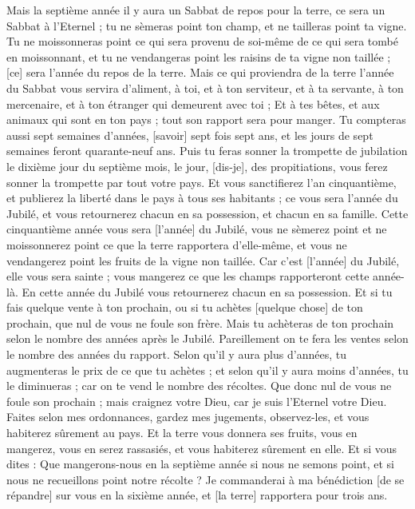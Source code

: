 \begin{multicols}{2}
Mais la septième année il y aura un Sabbat de repos pour la terre, ce sera un Sabbat à l'Eternel ; tu ne sèmeras point ton champ, et ne tailleras point ta vigne.
Tu ne moissonneras point ce qui sera provenu de soi-même de ce qui sera tombé en moissonnant, et tu ne vendangeras point les raisins de ta vigne non taillée ; [ce] sera l'année du repos de la terre.
Mais ce qui proviendra de la terre l'année du Sabbat vous servira d'aliment, à toi, et à ton serviteur, et à ta servante, à ton mercenaire, et à ton étranger qui demeurent avec toi ;
Et à tes bêtes, et aux animaux qui sont en ton pays ; tout son rapport sera pour manger.
Tu compteras aussi sept semaines d'années, [savoir] sept fois sept ans, et les jours de sept semaines feront quarante-neuf ans.
Puis tu feras sonner la trompette de jubilation le dixième jour du septième mois, le jour, [dis-je], des propitiations, vous ferez sonner la trompette par tout votre pays.
Et vous sanctifierez l'an cinquantième, et publierez la liberté dans le pays à tous ses habitants ; ce vous sera l'année du Jubilé, et vous retournerez chacun en sa possession, et chacun en sa famille.
Cette cinquantième année vous sera [l'année] du Jubilé, vous ne sèmerez point et ne moissonnerez point ce que la terre rapportera d'elle-même, et vous ne vendangerez point les fruits de la vigne non taillée.
Car c'est [l'année] du Jubilé, elle vous sera sainte ; vous mangerez ce que les champs rapporteront cette année-là.
En cette année du Jubilé vous retournerez chacun en sa possession.
Et si tu fais quelque vente à ton prochain, ou si tu achètes [quelque chose] de ton prochain, que nul de vous ne foule son frère.
Mais tu achèteras de ton prochain selon le nombre des années après le Jubilé. Pareillement on te fera les ventes selon le nombre des années du rapport.
Selon qu'il y aura plus d'années, tu augmenteras le prix de ce que tu achètes ; et selon qu'il y aura moins d'années, tu le diminueras ; car on te vend le nombre des récoltes.
Que donc nul de vous ne foule son prochain ; mais craignez votre Dieu, car je suis l'Eternel votre Dieu.
Faites selon mes ordonnances, gardez mes jugements, observez-les, et vous habiterez sûrement au pays.
Et la terre vous donnera ses fruits, vous en mangerez, vous en serez rassasiés, et vous habiterez sûrement en elle.
Et si vous dites : Que mangerons-nous en la septième année si nous ne semons point, et si nous ne recueillons point notre récolte ?
Je commanderai à ma bénédiction [de se répandre] sur vous en la sixième année, et [la terre] rapportera pour trois ans.

\end{multicols}
